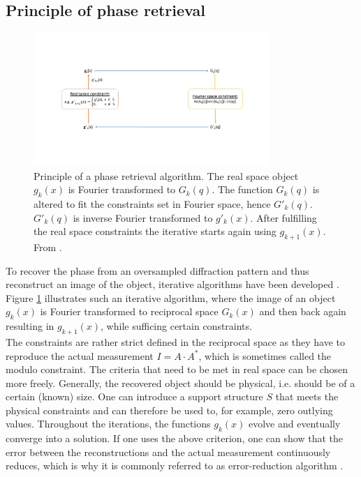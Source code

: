 \subsection{Principle of phase retrieval}\label{sec:phase-retrieval-fundamental}
\begin{figure}
	\centering
		\includegraphics[width=0.80\textwidth]{images/phase-retrieval-algorithm.jpg}
	\caption[Example of a phase retrieval algorithm.]{Principle of a phase retrieval algorithm. The real space object $g_{k}\left(x\right)$ is Fourier transformed to $G_{k}\left(q\right)$. The function $G_{k}\left(q\right)$ is altered to fit the constraints set in Fourier space, hence $G'_{k}\left(q\right)$. $G'_{k}\left(q\right)$ is inverse Fourier transformed to $g'_{k}\left(x\right)$. After fulfilling the real space constraints the iterative starts again using $g_{k+1}\left(x\right)$. From \citep{Fienup-1982-AO}.}
	\label{fig:phase-retrieval-algorithm}
\end{figure}
To recover the phase from an oversampled diffraction pattern and thus reconstruct an image of the object, iterative algorithms have been developed \cite{Fienup-1982-AO}. Figure \ref{fig:phase-retrieval-algorithm} illustrates such an iterative algorithm, where the image of an object $g_{k}\left(x\right)$ is Fourier transformed to reciprocal space $G_{k}\left(x\right)$ and then back again resulting in $g_{k+1}(x)$, while sufficing certain constraints.\\
The constraints are rather strict defined in the reciprocal space as they have to reproduce the actual measurement $I=A\cdot A^{*}$, which is sometimes called the modulo constraint. The criteria that need to be met in real space can be chosen more freely. Generally, the recovered object should be physical, i.e. should be of a certain (known) size. One can introduce a support structure $S$ that meets the physical constraints and can therefore be used to, for example, zero outlying values. Throughout the iterations, the functions $g_{k}(x)$ evolve and eventually converge into a solution. If one uses the above criterion, one can show that the error between the reconstructions and the actual measurement continuously reduces, which is why it is commonly referred to as error-reduction algorithm \cite{Fienup-1978-OL}.
%
%
%
%
